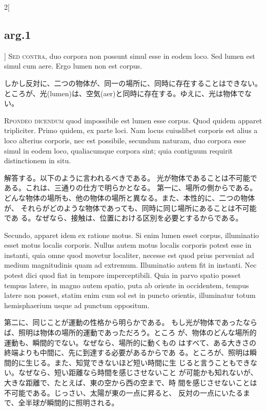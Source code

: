\documentclass[paper=a4paper,fontsize=10pt,jafontsize=9pt,titlepage]{jlreq}
\begin{document}
\begin{paracol}{2}[\subsection{arg.1}]
{\scshape Sed contra}, duo corpora non possunt simul
esse in eodem loco. Sed lumen est simul cum aere. Ergo lumen non est
corpus.

\switchcolumn

しかし反対に、二つの物体が、同一の場所に、同時に存在することはできない。
 ところが、光(lumen)は、空気(aer)と同時に存在する。ゆえに、光は物体でない。

\switchcolumn*

{\scshape Rpondeo dicendum} quod impossibile est lumen
esse corpus. Quod quidem apparet tripliciter. Primo quidem, ex parte
loci. Nam locus cuiuslibet corporis est alius a loco alterius corporis,
nec est possibile, secundum naturam, duo corpora esse simul in eodem
loco, qualiacumque corpora sint; quia contiguum requirit distinctionem
in situ.

\switchcolumn

解答する。以下のように言われるべきである。
光が物体であることは不可能である。これは、三通りの仕方で明らかとなる。
第一に、場所の側からである。
どんな物体の場所も、他の物体の場所と異なる。また、本性的に、二つの物体が、
 それらがどのような物体であっても、同時に同じ場所にあることは不可能であ
 る。なぜなら、接触は、位置における区別を必要とするからである。

\switchcolumn*

Secundo, apparet idem ex ratione motus. Si enim lumen esset
corpus, illuminatio esset motus localis corporis. Nullus autem motus
localis corporis potest esse in instanti, quia omne quod movetur
localiter, necesse est quod prius perveniat ad medium magnitudinis quam
ad extremum. Illuminatio autem fit in instanti. Nec potest dici quod
fiat in tempore imperceptibili. Quia in parvo spatio posset tempus
latere, in magno autem spatio, puta ab oriente in occidentem, tempus
latere non posset, statim enim cum sol est in puncto orientis,
illuminatur totum hemisphaerium usque ad punctum oppositum.

\switchcolumn

第二に、同じことが運動の性格から明らかである。
もし光が物体であったならば、照明は物体の場所的運動であっただろう。ところ
 が、物体のどんな場所的運動も、瞬間的でない。なぜなら、場所的に動くもの
 はすべて、ある大きさの終端よりも中間に、先に到達する必要があるからであ
 る。ところが、照明は瞬間的に生じる。また、知覚できないほど短い時間に生
 じると言うこともできない。なぜなら、短い距離なら時間を感じさせないこと
 が可能かも知れないが、大きな距離で、たとえば、東の空から西の空まで、時
 間を感じさせないことは不可能である。じっさい、太陽が東の一点に昇ると、
 反対の一点にいたるまで、全半球が瞬間的に照明される。


\end{paracol}
\end{document}
